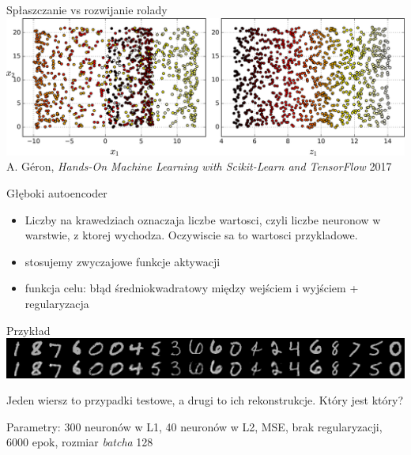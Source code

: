 \documentclass{sa}
\newcommand{\nnconn}[3]{\draw[->] (#1) -- (#2) node[midway,right] {#3};}
\begin{document}
\begin{frame}{Spłaszczanie vs rozwijanie rolady}
	\centering
	\includegraphics[width=\textwidth]{mlst_0805.png}
	{\vfill\footnotesize A. Géron, \emph{Hands-On Machine Learning with Scikit-Learn and TensorFlow} 2017}
\end{frame}
\begin{frame}{Głęboki autoencoder}
	\centering
	{
		\begin{itemize}
			\item Liczby na krawedziach oznaczaja liczbe wartosci, czyli liczbe neuronow w warstwie, z ktorej wychodza. Oczywiscie sa to wartosci przykladowe.
			\item stosujemy zwyczajowe funkcje aktywacji
			\item funkcja celu: błąd średniokwadratowy między wejściem i wyjściem + regularyzacja
		\end{itemize}
	}
\end{frame}
\begin{frame}{Przykład}
	\includegraphics[width=\textwidth]{08_autoencoders/traditional.png}
	
	Jeden wiersz to przypadki testowe, a drugi to ich rekonstrukcje. Który jest który?
	
	\pause
	\vfill
	Parametry: 300 neuronów w L1, 40 neuronów w L2, MSE, brak regularyzacji, 6000 epok, rozmiar \emph{batcha} 128
\end{frame}
\end{document}

